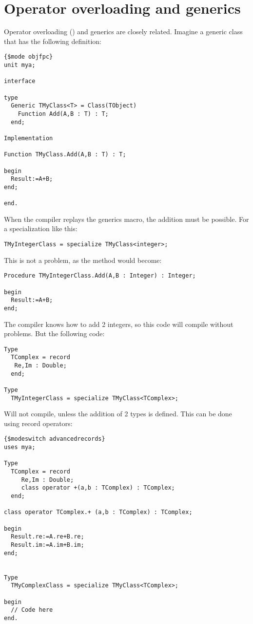 \section{Operator overloading and generics}
Operator overloading () and  generics are closely related. 
Imagine a generic class that has the following definition:
\begin{verbatim}
{$mode objfpc}
unit mya;

interface

type
  Generic TMyClass<T> = Class(TObject)
    Function Add(A,B : T) : T;
  end;

Implementation

Function TMyClass.Add(A,B : T) : T;

begin
  Result:=A+B;
end;

end.
\end{verbatim}
When the compiler replays the generics macro, the addition must be possible.
For a specialization like this:
\begin{verbatim}
TMyIntegerClass = specialize TMyClass<integer>;
\end{verbatim}
This is not a problem, as the  method would become:
\begin{verbatim}
Procedure TMyIntegerClass.Add(A,B : Integer) : Integer;

begin
  Result:=A+B;
end;
\end{verbatim}
The compiler knows how to add 2 integers, so this code will compile without
problems. But the following code:
\begin{verbatim}
Type
  TComplex = record
   Re,Im : Double;
  end;

Type
  TMyIntegerClass = specialize TMyClass<TComplex>;
\end{verbatim}
Will not compile, unless the addition of 2  types is defined.
This can be done using record operators:
\begin{verbatim}
{$modeswitch advancedrecords}
uses mya;

Type
  TComplex = record
     Re,Im : Double;
     class operator +(a,b : TComplex) : TComplex;
  end;

class operator TComplex.+ (a,b : TComplex) : TComplex;

begin
  Result.re:=A.re+B.re;
  Result.im:=A.im+B.im;
end;


Type
  TMyComplexClass = specialize TMyClass<TComplex>;

begin
  // Code here
end.
\end{verbatim}
